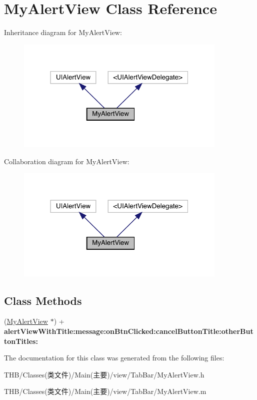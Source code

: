\hypertarget{interface_my_alert_view}{}\section{My\+Alert\+View Class Reference}
\label{interface_my_alert_view}


Inheritance diagram for My\+Alert\+View\+:\nopagebreak
\begin{figure}[H]
\begin{center}
\leavevmode
\includegraphics[width=286pt]{interface_my_alert_view__inherit__graph}
\end{center}
\end{figure}


Collaboration diagram for My\+Alert\+View\+:\nopagebreak
\begin{figure}[H]
\begin{center}
\leavevmode
\includegraphics[width=286pt]{interface_my_alert_view__coll__graph}
\end{center}
\end{figure}
\subsection*{Class Methods}
\begin{DoxyCompactItemize}
\item 
\mbox{\label{interface_my_alert_view_a6b6ccf23ca361954b5c37d3bc82c71ba}} 
(\mbox{\hyperlink{interface_my_alert_view}{My\+Alert\+View}} $\ast$) + {\bfseries alert\+View\+With\+Title\+:message\+:on\+Btn\+Clicked\+:cancel\+Button\+Title\+:other\+Button\+Titles\+:}
\end{DoxyCompactItemize}


The documentation for this class was generated from the following files\+:\begin{DoxyCompactItemize}
\item 
T\+H\+B/\+Classes(类文件)/\+Main(主要)/view/\+Tab\+Bar/My\+Alert\+View.\+h\item 
T\+H\+B/\+Classes(类文件)/\+Main(主要)/view/\+Tab\+Bar/My\+Alert\+View.\+m\end{DoxyCompactItemize}
